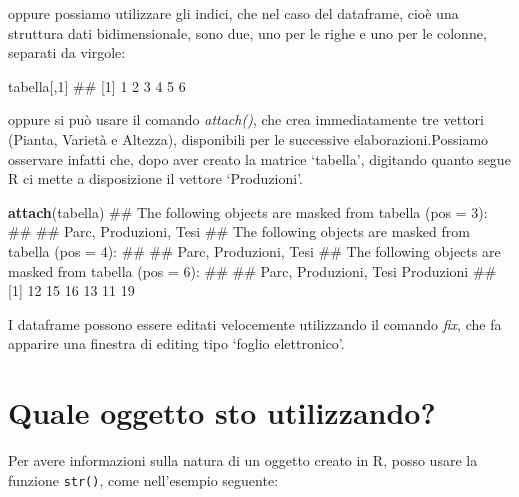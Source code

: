 \documentclass[a4paper,12pt,oneside]{book}
\newenvironment{Shaded}{\begin{snugshade}}{\end{snugshade}}
\newcommand{\KeywordTok}[1]{\textcolor[rgb]{0.13,0.29,0.53}{\textbf{#1}}}
\newcommand{\DecValTok}[1]{\textcolor[rgb]{0.00,0.00,0.81}{#1}}
\newcommand{\NormalTok}[1]{#1}
\theoremstyle{definition}
\theoremstyle{definition}
\theoremstyle{definition}
\theoremstyle{remark}
\begin{document}
oppure possiamo utilizzare gli indici, che nel caso del dataframe, cioè
una struttura dati bidimensionale, sono due, uno per le righe e uno per
le colonne, separati da virgole:

\begin{Shaded}
\begin{Highlighting}[]
\NormalTok{tabella[,}\DecValTok{1}\NormalTok{]}
\NormalTok{## [1] 1 2 3 4 5 6}
\end{Highlighting}
\end{Shaded}

oppure si può usare il comando \emph{attach()}, che crea immediatamente
tre vettori (Pianta, Varietà e Altezza), disponibili per le successive
elaborazioni.Possiamo osservare infatti che, dopo aver creato la matrice
`tabella', digitando quanto segue R ci mette a disposizione il vettore
`Produzioni'.

\begin{Shaded}
\begin{Highlighting}[]
\KeywordTok{attach}\NormalTok{(tabella)}
\NormalTok{## The following objects are masked from tabella (pos = 3):}
\NormalTok{## }
\NormalTok{##     Parc, Produzioni, Tesi}
\NormalTok{## The following objects are masked from tabella (pos = 4):}
\NormalTok{## }
\NormalTok{##     Parc, Produzioni, Tesi}
\NormalTok{## The following objects are masked from tabella (pos = 6):}
\NormalTok{## }
\NormalTok{##     Parc, Produzioni, Tesi}
\NormalTok{Produzioni}
\NormalTok{## [1] 12 15 16 13 11 19}
\end{Highlighting}
\end{Shaded}

I dataframe possono essere editati velocemente utilizzando il comando
\emph{fix}, che fa apparire una finestra di editing tipo `foglio
elettronico'.

\section*{Quale oggetto sto
utilizzando?}\label{quale-oggetto-sto-utilizzando}

Per avere informazioni sulla natura di un oggetto creato in R, posso
usare la funzione \texttt{str()}, come nell'esempio seguente:

\begin{Shaded}
\end{Shaded}
\end{document}
